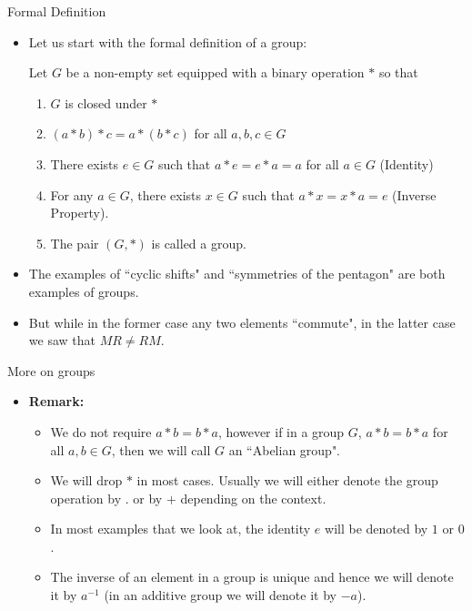 \documentclass[ %
 10pt, xcolor={dvipsnames,svgnames,x11names,hyperref},
   hyperref={colorlinks=true,citecolor=green,linkcolor=DarkRed,urlcolor=ProcessBlue,anchorcolor=blue}
  ]{beamer}
\newenvironment{stepitemize}{\begin{itemize}[<+->]}{\end{itemize} }
\begin{document}
\begin{frame}{Formal Definition}
\begin{stepitemize}
    \item Let us start with the formal definition of a group:
 \begin{definition}
Let $G$ be a non-empty set equipped with a binary operation $*$ so that 
\begin{enumerate}
    \item $G$ is closed under $*$
    \item $(a*b)*c=a*(b*c)$ for all $a,b,c \in G$
    \item There exists $e\in G$ such that $a*e=e*a=a$ for all $a \in G$ (Identity)
    \item For any $a\in G$, there exists $x\in G$ such that $a*x=x*a=e$ (Inverse Property).
    \item []The pair $(G, *)$ is called a group.
\end{enumerate}
\end{definition}
\item The examples of ``cyclic shifts" and ``symmetries of the pentagon" are both examples of groups. 
\item But while in the former case any two elements ``commute", in the latter case we saw that $MR\neq RM$.
\end{stepitemize}
\end{frame}
\begin{frame}{More on groups}
\begin{stepitemize}    
\item []{\bf Remark:}
\begin{itemize}
    \item We do not require $a*b=b*a$, however if in a group $G$, $a*b=b*a$ for all $a,b\in G$, then we will call $G$ an ``Abelian group". 
    \item We will drop $*$ in most cases. Usually we will either denote the group operation by $.$ or by $+$ depending on the context. 
    \item In most examples that we look at, the identity $e$ will be denoted by $1$ or $0$. 
    \item The inverse of an element in a group is unique and hence we will denote it by $a^{-1}$ (in an additive group we will denote it by $-a$).
\end{itemize}
\end{stepitemize}
    
\end{frame}
\end{document}
